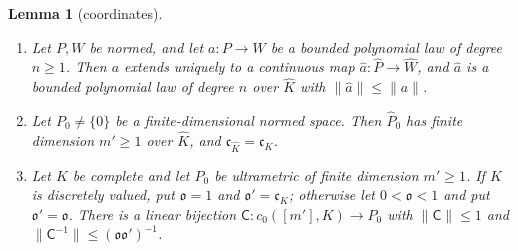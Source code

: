 \documentclass[11pt]{amsart}
\newtheorem{lemma}[theorem]{Lemma}
\theoremstyle{definition}
\theoremstyle{remark}
\numberwithin{equation}{section}
\newcommand{\norm}[1]{\lVert #1\rVert}
\newcommand{\Kh}{\widehat K}
\theoremstyle{plain}
\theoremstyle{definition}
\theoremstyle{plain}
\begin{document}
\begin{lemma}[coordinates]\label{amb:lem:coordinates}
\leavevmode
\begin{enumerate}
\item Let $P,W$ be normed, and let $a\colon P\to W$ be a bounded polynomial law of degree $n\ge1$. Then $a$
extends uniquely to a continuous map $\hat a\colon\widehat P\to\widehat W$, and $\hat a$ is a bounded polynomial law of
degree $n$ over $\Kh$ with $\norm{\hat a}\le\norm a$.
\item Let $P_0\ne\{0\}$ be a finite-dimensional normed space. Then $\widehat P_0$ has finite dimension $m'\ge1$ over
$\Kh$, and $\mathfrak c_{\Kh}=\mathfrak c_K$.
\item Let $K$ be complete and let $P_0$ be ultrametric of finite dimension $m'\ge1$. If $K$ is discretely valued, put
$\mathfrak o=1$ and $\mathfrak o'=\mathfrak c_K$; otherwise let $0<\mathfrak o<1$ and put $\mathfrak o'=\mathfrak o$. There
is a linear bijection $\mathsf C\colon c_0([m'],K)\to P_0$ with $\norm{\mathsf C}\le1$ and
$\norm{\mathsf C^{-1}}\le(\mathfrak o\mathfrak o')^{-1}$.
\end{enumerate}
\end{lemma}
\end{document}
